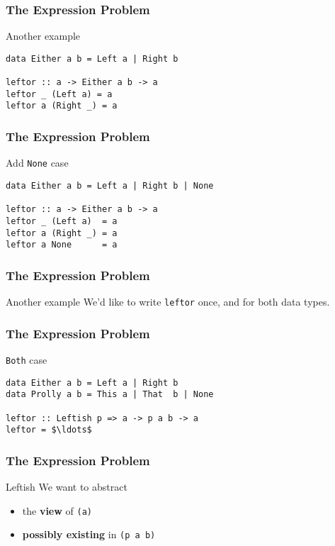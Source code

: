 \begin{frame}[fragile]
\frametitle{The Expression Problem}
\begin{block}{Another example}
\begin{lstlisting}[style=haskell,mathescape]
data Either a b = Left a | Right b

leftor :: a -> Either a b -> a
leftor _ (Left a) = a
leftor a (Right _) = a
\end{lstlisting}
\end{block}
\end{frame}

\begin{frame}[fragile]
\frametitle{The Expression Problem}
\begin{block}{Add \lstinline[style=haskell]{None} case}
\begin{lstlisting}[style=haskell,mathescape]
data Either a b = Left a | Right b | None

leftor :: a -> Either a b -> a
leftor _ (Left a)  = a
leftor a (Right _) = a
leftor a None      = a
\end{lstlisting}
\end{block}
\end{frame}

\begin{frame}[fragile]
\frametitle{The Expression Problem}
\begin{block}{Another example}
We'd like to write \lstinline[style=haskell]{leftor} once, and for both data types.
\end{block}
\end{frame}

\begin{frame}[fragile]
\frametitle{The Expression Problem}
\begin{block}{\lstinline[style=haskell]{Both} case}
\begin{lstlisting}[style=haskell,mathescape]
data Either a b = Left a | Right b
data Prolly a b = This a | That  b | None 

leftor :: Leftish p => a -> p a b -> a
leftor = $\ldots$
\end{lstlisting}
\end{block}
\end{frame}

\begin{frame}[fragile]
\frametitle{The Expression Problem}
\begin{block}{Leftish}
We want to abstract
\begin{itemize}
\item the \textbf{view} of \lstinline{(a)}
\item \textbf{possibly existing} in \lstinline{(p a b)}
\end{itemize}
\end{block}
\end{frame}
